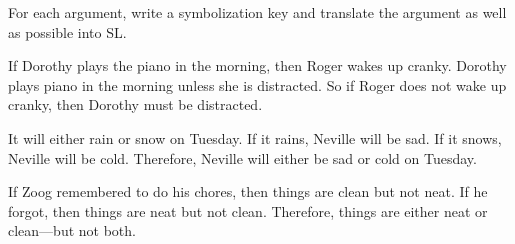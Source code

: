 \problempart
For each argument, write a symbolization key and translate the argument as well as possible into SL.
\begin{earg}
\item If Dorothy plays the piano in the morning, then Roger wakes up cranky. Dorothy plays piano in the morning unless she is distracted. So if Roger does not wake up cranky, then Dorothy must be distracted.

\item It will either rain or snow on Tuesday. If it rains, Neville will be sad. If it snows, Neville will be cold. Therefore, Neville will either be sad or cold on Tuesday.



\item If Zoog remembered to do his chores, then things are clean but not neat. If he forgot, then things are neat but not clean. Therefore, things are either neat or clean---but not both.
\end{earg}


